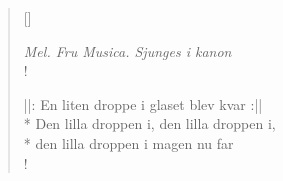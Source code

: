 
\settowidth{\versewidth}{Den lilla droppen i, den lilla droppen i,}



\begin{verse}[\versewidth]

\flagverse{}
\emph{Mel. Fru Musica. Sjunges i kanon}\\!

||: En liten droppe i glaset blev kvar :||\\*
Den lilla droppen i, den lilla droppen i,\\*
den lilla droppen i magen nu far\\!


\end{verse}

